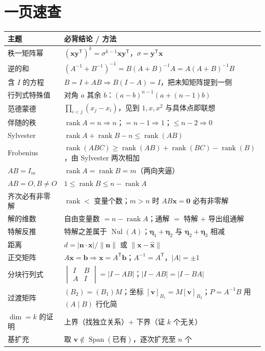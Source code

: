 \documentclass[10pt]{ctexart}
\newcommand{\rank}{\operatorname{rank}}
\newcommand{\Nul}{\operatorname{Nul}}
\newcommand{\Span}{\operatorname{Span}}
\newcommand{\TT}{^{\mathsf T}}
\begin{document}
\section*{一页速查}

\begin{center}
\small
\renewcommand{\arraystretch}{1.25}
\begin{tabular}{@{}p{3.4cm}p{10.4cm}@{}}
\toprule
\textbf{主题} & \textbf{必背结论 / 方法}\\
\midrule
秩一矩阵幂 & $(\mathbf x\mathbf y\TT)^k=\sigma^{k-1}\mathbf x\mathbf y\TT$，$\sigma=\mathbf y\TT\mathbf x$\\
逆的和 & $(A^{-1}+B^{-1})^{-1}=B(A+B)^{-1}A=A(A+B)^{-1}B$\\
含 $I$ 的方程 & $B=I+AB\Rightarrow B(I-A)=I$，把未知矩阵提到一侧\\
行列式特殊值 & 对角 $a$ 其余 $b$：$(a-b)^{n-1}(a+(n-1)b)$\\
范德蒙德 & $\prod_{i<j}(x_j-x_i)$，见到 $1,x,x^2$ 与具体点即联想\\
伴随的秩 & $\rank A=n\Rightarrow n$；$=n-1\Rightarrow1$；$\le n-2\Rightarrow0$\\
Sylvester & $\rank A+\rank B-n\le\rank(AB)$\\
Frobenius & $\rank(ABC)\ge\rank(AB)+\rank(BC)-\rank(B)$，由 Sylvester 两次相加\\
$AB=I_m$ & $\rank A=\rank B=m$（两向夹逼）\\
$AB=O,B\ne O$ & $1\le\rank B\le n-\rank A$\\
齐次必有非零解 & $\rank<$ 变量个数；$m>n$ 时 $AB\mathbf x=\mathbf 0$ 必有非零解\\
解的维数 & 自由变量数 $=n-\rank A$；通解 $=$ 特解 $+$ 导出组通解\\
特解反推 & 特解之差属于 $\Nul(A)$；$\boldsymbol\eta_1+\boldsymbol\eta_2$ 与 $\boldsymbol\eta_2+\boldsymbol\eta_3$ 相减\\
距离 & $d=\lvert\mathbf n\cdot\mathbf x\rvert/\lVert\mathbf n\rVert$ 或 $\lVert\mathbf x-\hat{\mathbf x}\rVert$\\
正交矩阵 & $A\mathbf x=\mathbf b\Rightarrow\mathbf x=A\TT\mathbf b$；$A^{-1}=A\TT$，$\lvert A\rvert=\pm1$\\
分块行列式 & $\begin{vmatrix}I&B\\A&I\end{vmatrix}=|I-AB|$；$|I-AB|=|I-BA|$\\
过渡矩阵 & $(B_2)=(B_1)M$；坐标 $[\mathbf v]_{B_1}=M[\mathbf v]_{B_2}$；$P=A^{-1}B$ 用 $(A\mid B)$ 行化简\\
$\dim=k$ 的证明 & 上界（找独立关系）$+$ 下界（证 $k$ 个无关）\\
基扩充 & 取 $\mathbf v\notin\Span(\text{已有})$，逐次扩充至 $n$ 个\\
\bottomrule
\end{tabular}
\end{center}
\end{document}
